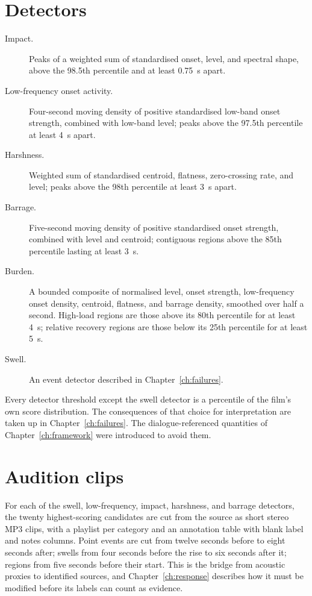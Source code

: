\section{Detectors}

\begin{description}
\item[Impact.] Peaks of a weighted sum of standardised onset, level, and spectral shape, above the 98.5th percentile and at least 0.75~s apart.
\item[Low-frequency onset activity.] Four-second moving density of positive standardised low-band onset strength, combined with low-band level; peaks above the 97.5th percentile at least 4~s apart.
\item[Harshness.] Weighted sum of standardised centroid, flatness, zero-crossing rate, and level; peaks above the 98th percentile at least 3~s apart.
\item[Barrage.] Five-second moving density of positive standardised onset strength, combined with level and centroid; contiguous regions above the 85th percentile lasting at least 3~s.
\item[Burden.] A bounded composite of normalised level, onset strength, low-frequency onset density, centroid, flatness, and barrage density, smoothed over half a second. High-load regions are those above its 80th percentile for at least 4~s; relative recovery regions are those below its 25th percentile for at least 5~s.
\item[Swell.] An event detector described in Chapter~\ref{ch:failures}.
\end{description}

Every detector threshold except the swell detector is a percentile of the film's own score distribution. The consequences of that choice for interpretation are taken up in Chapter~\ref{ch:failures}. The dialogue-referenced quantities of Chapter~\ref{ch:framework} were introduced to avoid them.

\section{Audition clips}

For each of the swell, low-frequency, impact, harshness, and barrage detectors, the twenty highest-scoring candidates are cut from the source as short stereo MP3 clips, with a playlist per category and an annotation table with blank label and notes columns. Point events are cut from twelve seconds before to eight seconds after; swells from four seconds before the rise to six seconds after it; regions from five seconds before their start. This is the bridge from acoustic proxies to identified sources, and Chapter~\ref{ch:response} describes how it must be modified before its labels can count as evidence.

